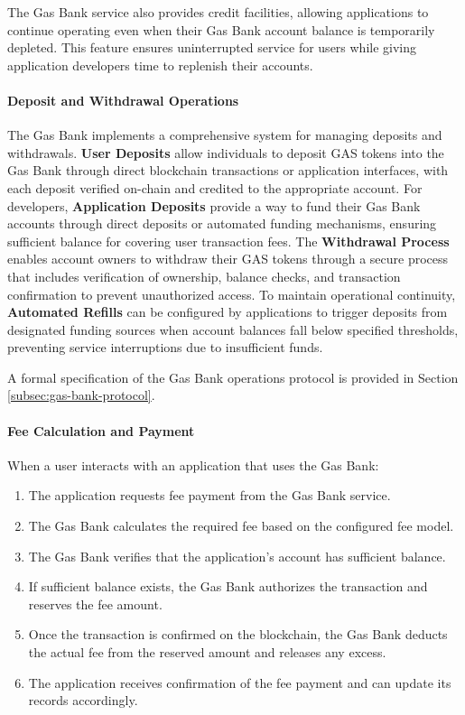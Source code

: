 \documentclass[12pt,a4paper]{article}
\begin{document}
The Gas Bank service also provides credit facilities, allowing applications to continue operating even when their Gas Bank account balance is temporarily depleted. This feature ensures uninterrupted service for users while giving application developers time to replenish their accounts.



\paragraph{Deposit and Withdrawal Operations}
The Gas Bank implements a comprehensive system for managing deposits and withdrawals. \textbf{User Deposits} allow individuals to deposit GAS tokens into the Gas Bank through direct blockchain transactions or application interfaces, with each deposit verified on-chain and credited to the appropriate account. For developers, \textbf{Application Deposits} provide a way to fund their Gas Bank accounts through direct deposits or automated funding mechanisms, ensuring sufficient balance for covering user transaction fees. The \textbf{Withdrawal Process} enables account owners to withdraw their GAS tokens through a secure process that includes verification of ownership, balance checks, and transaction confirmation to prevent unauthorized access. To maintain operational continuity, \textbf{Automated Refills} can be configured by applications to trigger deposits from designated funding sources when account balances fall below specified thresholds, preventing service interruptions due to insufficient funds.

A formal specification of the Gas Bank operations protocol is provided in Section \ref{subsec:gas-bank-protocol}.



\paragraph{Fee Calculation and Payment}
When a user interacts with an application that uses the Gas Bank:

\begin{enumerate}
    \item The application requests fee payment from the Gas Bank service.
    \item The Gas Bank calculates the required fee based on the configured fee model.
    \item The Gas Bank verifies that the application's account has sufficient balance.
    \item If sufficient balance exists, the Gas Bank authorizes the transaction and reserves the fee amount.
    \item Once the transaction is confirmed on the blockchain, the Gas Bank deducts the actual fee from the reserved amount and releases any excess.
    \item The application receives confirmation of the fee payment and can update its records accordingly.
\end{enumerate}
\end{document}
